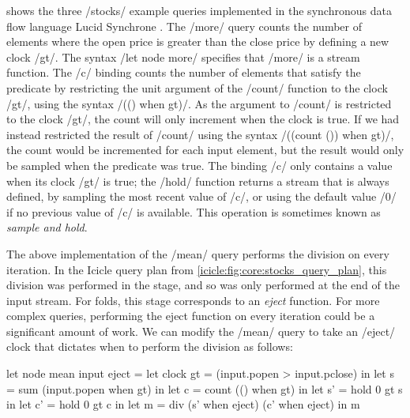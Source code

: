  shows the three \Lucy/stocks/ example queries implemented in the synchronous data flow language Lucid Synchrone \citep{caspi1995functional}.
The \Lucy/more/ query counts the number of elements where the open price is greater than the close price by defining a new clock \Lucy/gt/.
The syntax \Lucy/let node more/ specifies that \Lucy/more/ is a stream function.
The \Lucy/c/ binding counts the number of elements that satisfy the predicate by restricting the unit argument of the \Lucy/count/ function to the clock \Lucy/gt/, using the syntax \Lucy/(() when gt)/.
As the argument to \Lucy/count/ is restricted to the clock \Lucy/gt/, the count will only increment when the clock is true.
If we had instead restricted the result of \Lucy/count/ using the syntax \Lucy/((count ()) when gt)/, the count would be incremented for each input element, but the result would only be sampled when the predicate was true.
The binding \Lucy/c/ only contains a value when its clock \Lucy/gt/ is true; the \Lucy/hold/ function returns a stream that is always defined, by sampling the most recent value of \Lucy/c/, or using the default value \Lucy/0/ if no previous value of \Lucy/c/ is available.
This operation is sometimes known as \emph{sample and hold}.

The above implementation of the \Lucy/mean/ query performs the division on every iteration.
In the Icicle query plan from \cref{icicle:fig:core:stocks_query_plan}, this division was performed in the \IcC@after@ stage, and so was only performed at the end of the input stream.
For folds, this \IcC@after@ stage corresponds to an \emph{eject} function.
For more complex queries, performing the eject function on every iteration could be a significant amount of work.
We can modify the \Lucy/mean/ query to take an \Lucy/eject/ clock that dictates when to perform the division as follows:

\begin{lucy}
let node mean input eject =
 let clock gt = (input.popen > input.pclose)
 in let s     = sum (input.popen when gt)
 in let c     = count (() when gt)
 in let s'    = hold 0 gt s
 in let c'    = hold 0 gt c
 in let m     = div (s' when eject) (c' when eject)
 in m
\end{lucy}

